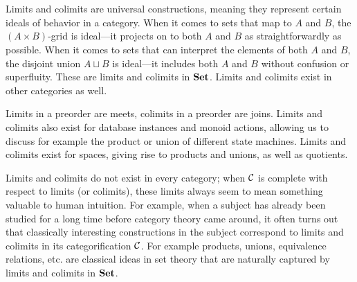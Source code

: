 \documentclass[CT4S-EN-RU]{subfiles}
\begin{document}
\section{}

\begin{blockENG}
Limits and colimits are universal constructions, meaning they represent certain ideals of behavior in a category. When it comes to sets that map to $A$ and $B$, the $(A\times B)$-grid is ideal—it projects on to both $A$ and $B$ as straightforwardly as possible. When it comes to sets that can interpret the elements of both $A$ and $B$, the disjoint union $A\sqcup B$ is ideal—it includes both $A$ and $B$ without confusion or superfluity. These are limits and colimits in ${\mathbf{Set}}$. Limits and colimits exist in other categories as well.
\end{blockENG}

\begin{blockRUS}
\end{blockRUS}

\begin{blockENG}
Limits in a preorder are meets, colimits in a preorder are joins. Limits and colimits also exist for database instances and monoid actions, allowing us to discuss for example the product or union of different state machines. Limits and colimits exist for spaces, giving rise to products and unions, as well as quotients.
\end{blockENG}

\begin{blockRUS}
\end{blockRUS}

\begin{blockENG}
Limits and colimits do not exist in every category; when $\mathcal{C}$ is complete with respect to limits (or colimits), these limits always seem to mean something valuable to human intuition. For example, when a subject has already been studied for a long time before category theory came around, it often turns out that classically interesting constructions in the subject correspond to limits and colimits in its categorification $\mathcal{C}$. For example products, unions, equivalence relations, etc. are classical ideas in set theory that are naturally captured by limits and colimits in ${\mathbf{Set}}$. 
\end{blockENG}

\begin{blockRUS}
\end{blockRUS}
\end{document}
